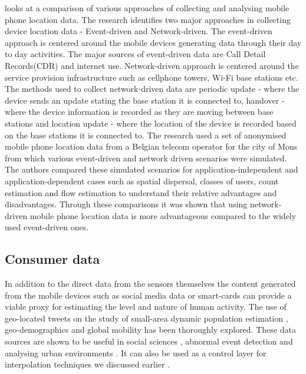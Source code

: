 \citep{pinelli2015} looks at a comparison of various approaches of collecting and analysing mobile phone location data.
The research identifies two major approaches in collecting device location data - Event-driven and Network-driven.
The event-driven approach is centered around the mobile devices generating data 
through their day to day activities.
The major sources of event-driven data are Call Detail Records(CDR) and internet use.
Network-driven approach is centered around the service provision infrastructure such as cellphone towers, Wi-Fi base stations etc.
The methods used to collect network-driven data are periodic update - where the device sends an update stating the base station it is connected to, handover - where the device information is recorded as they are moving between base stations and location update - where the location of the device is recorded based on the base stations it is connected to. 
The research used a set of anonymised mobile phone location data from a Belgian telecom operator for the city of Mons from which various event-driven and network driven scenarios were simulated. 
The authors compared these simulated scenarios for application-independent and application-dependent cases such as spatial dispersal, classes of users, count estimation and flow estimation to understand their relative advantages and disadvantages.
Through these comparisons it was shown that using network-driven mobile phone location data is more advantageous compared to the widely used event-driven ones.

\subsection{Consumer data}

In addition to the direct data from the sensors themselves the content generated from the mobile devices such as social media data or smart-cards \cite{zhong2016} can provide a viable proxy for estimating the level and nature of human activity.
The use of geo-located tweets on the study of small-area dynamic population estimation \citep{ordonez2012, marchetti2015, mckenzie2015, lansley2016a}, geo-demographics \citep{bawa-cavia2011, longley2015, lansley2016b} and global mobility \citep{hawelka2014} has been thoroughly explored.
These data sources are shown to be useful in social sciences \citep{crane2008}, abnormal event detection \citep{chae2012} and analysing urban environments \citep{sagl2012}.
It can also be used as a control layer for interpolation techniques we discussed earlier \citep{lin2015}.
